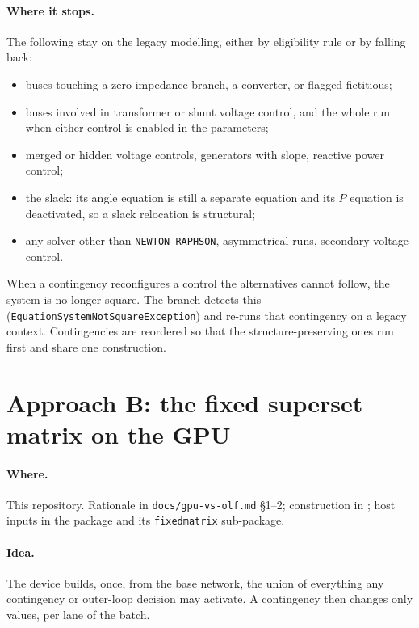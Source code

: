 \documentclass[11pt,a4paper]{article}
\newcommand{\code}[1]{\texttt{\small #1}}
\begin{document}
\paragraph{Where it stops.} The following stay on the legacy modelling, either by
eligibility rule or by falling back:
\begin{itemize}
\item buses touching a zero-impedance branch, a converter, or flagged fictitious;
\item buses involved in transformer or shunt voltage control, and the whole run when
      either control is enabled in the parameters;
\item merged or hidden voltage controls, generators with slope, reactive power control;
\item the slack: its angle equation is still a separate equation and its $P$ equation is
      deactivated, so a slack relocation is structural;
\item any solver other than \code{NEWTON\_RAPHSON}, asymmetrical runs, secondary voltage
      control.
\end{itemize}
When a contingency reconfigures a control the alternatives cannot follow, the system is
no longer square. The branch detects this (\code{EquationSystemNotSquareException}) and
re-runs that contingency on a legacy context. Contingencies are reordered so that the
structure-preserving ones run first and share one construction.

\section{Approach B: the fixed superset matrix on the GPU}

\paragraph{Where.} This repository. Rationale in \code{docs/gpu-vs-olf.md} \S1--2;
construction in ; host inputs in the
 package and its \code{fixedmatrix} sub-package.

\paragraph{Idea.} The device builds, once, from the base network, the union of everything
any contingency or outer-loop decision may activate. A contingency then changes only
values, per lane of the batch.
\end{document}
